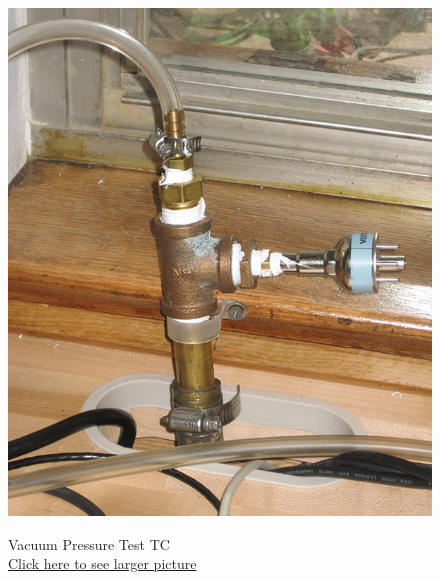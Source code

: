 \documentclass{../lab}
\begin{document}
\begin{figure}[!htb]
  \href{http://experimentationlab.berkeley.edu/sites/default/files/images/HAL_TC_Gauge_3533-Lg.jpg}{\includegraphics[width=\linewidth,keepaspectratio]{images/HAL_TC_Gauge_3533-Lg.jpg}}
  \caption{Vacuum Pressure Test TC \\ \href{http://experimentationlab.berkeley.edu/sites/default/files/images/HAL_TC_Gauge_3533-Lg.jpg}{Click here to see larger picture}}\label{fig:HAL_TC_Gauge_3533-Lg.jpg}
\endminipage
\end{figure}
\end{document}
